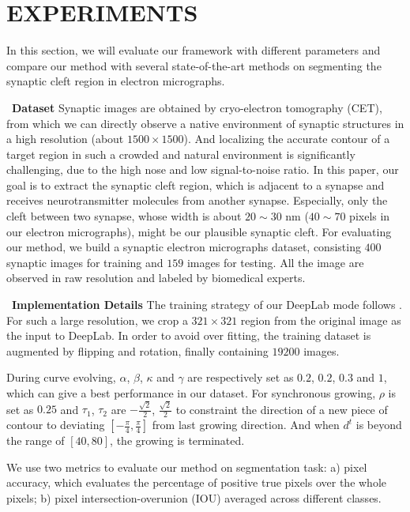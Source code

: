 \section{EXPERIMENTS}
\label{sec:experiments}
In this section, we will evaluate our framework with different parameters and compare our method with several state-of-the-art methods on segmenting the synaptic cleft region in electron micrographs.

~\noindent\textbf{Dataset}
Synaptic images are obtained by cryo-electron tomography (CET), from which we can directly observe a native environment of synaptic structures in a high resolution (about $1500\times 1500$).
%
And localizing the accurate contour of a target region in such a crowded and natural environment is significantly challenging, due to the high nose and low signal-to-noise ratio.
In this paper, our goal is to extract the synaptic cleft region, which is adjacent to a synapse and receives neurotransmitter molecules from another synapse.
Especially, only the cleft between two synapse, whose width is about $20\sim30$ nm ($40\sim70$ pixels in our electron micrographs), might be our plausible synaptic cleft.
%
For evaluating our method, we build a synaptic electron micrographs dataset, consisting $400$ synaptic images for training and $159$ images for testing.
All the image are observed in raw resolution and labeled by biomedical experts.

~\noindent\textbf{Implementation Details}
The training strategy of our DeepLab mode follows \cite{Chen2016a}.
For such a large resolution, we crop a $321\times 321$ region \cite{Chen2016} from the original image as the input to DeepLab.
In order to avoid over fitting, the training dataset is augmented by flipping and rotation, finally containing $19200$ images.

During curve evolving, $\alpha$, $\beta$, $\kappa$ and $\gamma$ are respectively set as $0.2$, $0.2$, $0.3$ and $1$, which can give a best performance in our dataset.
For synchronous growing, $\rho$ is set as $0.25$ and $\tau_1$, $\tau_2$ are $-\frac{\sqrt{2}}{2}$, $\frac{\sqrt{2}}{2}$ to constraint the direction of a new piece of contour to deviating $[-\frac{\pi}{4},\frac{\pi}{4}]$ from last growing direction.
And when $d^{t}$ is beyond the range of $[40,80]$, the growing is terminated.

We use two metrics \cite{Cheng2017} to evaluate our method on segmentation task:
a) pixel accuracy, which evaluates the percentage of positive true pixels over the whole pixels;
b) pixel intersection-overunion (IOU) averaged across different classes.

